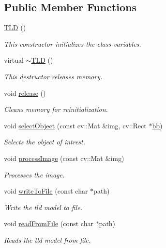 \subsection*{Public Member Functions}
\begin{DoxyCompactItemize}
\item 
\hyperlink{classtld_1_1TLD_a7dd24a107de7e84f9b0459c3bfa078aa}{T\-L\-D} ()
\begin{DoxyCompactList}\small\item\em This constructor initializes the class variables. \end{DoxyCompactList}\item 
virtual \hyperlink{classtld_1_1TLD_a0bd3497a3d97108b74a107ead3b716f5}{$\sim$\-T\-L\-D} ()
\begin{DoxyCompactList}\small\item\em This destructor releases memory. \end{DoxyCompactList}\item 
void \hyperlink{classtld_1_1TLD_a42636c4a6fef7de9b71af987151a7f9e}{release} ()
\begin{DoxyCompactList}\small\item\em Cleans memory for reinitialization. \end{DoxyCompactList}\item 
void \hyperlink{classtld_1_1TLD_a6a1b9edb0ae0f79d4447c2ff7ab983be}{select\-Object} (const cv\-::\-Mat \&img, cv\-::\-Rect $\ast$\hyperlink{namespacetld_aa5e13bbb9a53d3e9103d430b6113b08b}{bb})
\begin{DoxyCompactList}\small\item\em Selects the object of intrest. \end{DoxyCompactList}\item 
void \hyperlink{classtld_1_1TLD_a8161e09603dc40c43d314cfec9e0746b}{process\-Image} (const cv\-::\-Mat \&img)
\begin{DoxyCompactList}\small\item\em Processes the image. \end{DoxyCompactList}\item 
void \hyperlink{classtld_1_1TLD_aef7e6414e0334f8d4325360bd4ea3048}{write\-To\-File} (const char $\ast$path)
\begin{DoxyCompactList}\small\item\em Write the tld model to file. \end{DoxyCompactList}\item 
void \hyperlink{classtld_1_1TLD_a8474094a32dc39751bac54f8998860c5}{read\-From\-File} (const char $\ast$path)
\begin{DoxyCompactList}\small\item\em Reads the tld model from file. \end{DoxyCompactList}\end{DoxyCompactItemize}

